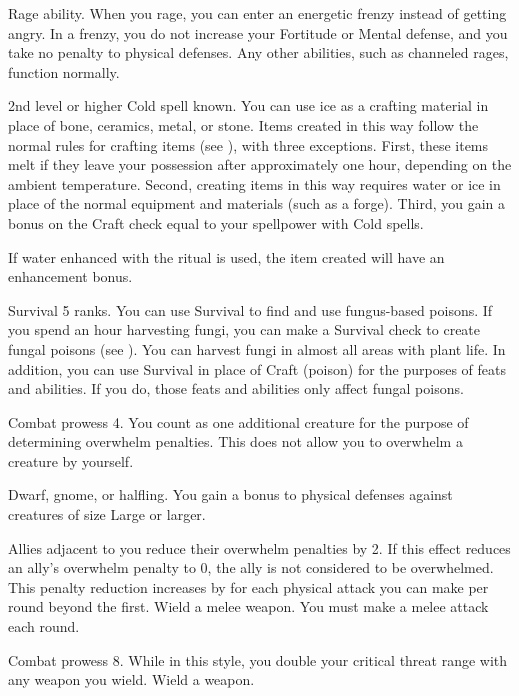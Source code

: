 \featpre Rage ability.
\featben When you rage, you can enter an energetic frenzy instead of getting angry. In a frenzy, you do not increase your Fortitude or Mental defense, and you take no penalty to physical defenses.
Any other abilities, such as channeled rages, function normally.

\featpre 2nd level or higher Cold spell known.
\featben You can use ice as a crafting material in place of bone, ceramics, metal, or stone.
Items created in this way follow the normal rules for crafting items (see ), with three exceptions.
First, these items melt if they leave your possession after approximately one hour, depending on the ambient temperature.
Second, creating items in this way requires water or ice in place of the normal equipment and materials (such as a forge).
Third, you gain a bonus on the Craft check equal to your spellpower with Cold spells.

If water enhanced with the  ritual is used, the item created will have an enhancement bonus.

\featpre Survival 5 ranks.
\featben You can use Survival to find and use fungus-based poisons.
If you spend an hour harvesting fungi, you can make a Survival check to create fungal poisons (see ).
You can harvest fungi in almost all areas with plant life.
In addition, you can use Survival in place of Craft (poison) for the purposes of feats and abilities.
If you do, those feats and abilities only affect fungal poisons.

\featpre Combat prowess 4.
\featben You count as one additional creature for the purpose of determining overwhelm penalties.
This does not allow you to overwhelm a creature by yourself.

\featpres Dwarf, gnome, or halfling.
\featben You gain a  bonus to physical defenses against creatures of size Large or larger.

\featben Allies adjacent to you reduce their overwhelm penalties by 2.
If this effect reduces an ally's overwhelm penalty to 0, the ally is not considered to be overwhelmed.
This penalty reduction increases by  for each physical attack you can make per round beyond the first.
\stylereq Wield a melee weapon.
You must make a melee attack each round.

\featpre Combat prowess 8.
\featben While in this style, you double your critical threat range with any weapon you wield.
\stylereq Wield a weapon.


